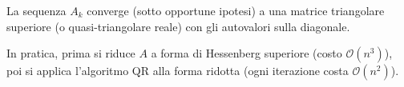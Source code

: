 La sequenza $A_k$ converge (sotto opportune ipotesi) a una matrice triangolare
superiore (o quasi-triangolare reale) con gli autovalori sulla diagonale.

In pratica, prima si riduce $A$ a forma di Hessenberg superiore
(costo $\mathcal{O}(n^3)$), poi si applica l'algoritmo QR alla forma ridotta
(ogni iterazione costa $\mathcal{O}(n^2)$).
